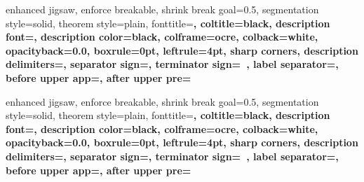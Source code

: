 %
{enhanced jigsaw,%
	enforce breakable,%
	shrink break goal=0.5\baselineskip,%
	segmentation style=solid,%
	theorem style=plain,%
	fonttitle=\sffamily\upshape\bfseries\small,%
	coltitle=black,%
	description font=\sffamily\upshape\bfseries\small,%
	description color=black,%
	colframe=ocre,%
	colback=white,%
	opacityback=0.0,%
	boxrule=0pt,%
	leftrule=4pt,%
	sharp corners,%
	description delimiters={}{},%
	separator sign={\nobreakspace {\color{black}---}},%
	terminator sign={\ },%
	label separator=,
	before upper app={},%
	after upper pre={\popdimen{\parindent}}}%
{}

%
{enhanced jigsaw,%
	enforce breakable,%
	shrink break goal=0.5\baselineskip,%
	segmentation style=solid,%
	theorem style=plain,%
	fonttitle=\sffamily\upshape\bfseries\small,%
	coltitle=black,%
	description font=\sffamily\upshape\bfseries\small,%
	description color=black,%
	colframe=ocre,%
	colback=white,%
	opacityback=0.0,%
	boxrule=0pt,%
	leftrule=4pt,%
	sharp corners,%
	description delimiters={}{},%
	separator sign={\nobreakspace {\color{black}---}},%
	terminator sign={\ },%
	label separator=,
	before upper app={},%
	after upper pre={\popdimen{\parindent}}}%
{}

